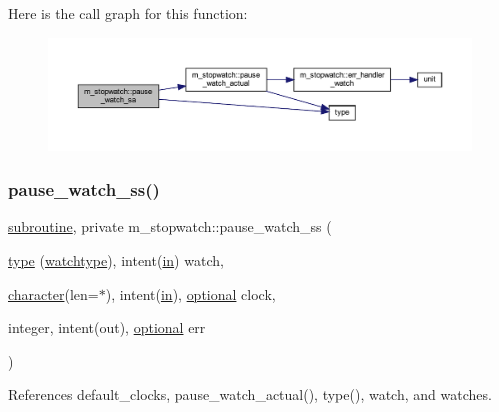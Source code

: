Here is the call graph for this function\+:
\nopagebreak
\begin{figure}[H]
\begin{center}
\leavevmode
\includegraphics[width=350pt]{namespacem__stopwatch_a5101b247e586498a826e1a7819bf13d5_cgraph}
\end{center}
\end{figure}
\mbox{\label{namespacem__stopwatch_afb410e70a5b4002d5028e0a284393959}} 
\subsubsection{\texorpdfstring{pause\+\_\+watch\+\_\+ss()}{pause\_watch\_ss()}}
{\footnotesize\ttfamily \hyperlink{M__stopwatch_83_8txt_acfbcff50169d691ff02d4a123ed70482}{subroutine}, private m\+\_\+stopwatch\+::pause\+\_\+watch\+\_\+ss (\begin{DoxyParamCaption}\item[{\hyperlink{stop__watch_83_8txt_a70f0ead91c32e25323c03265aa302c1c}{type} (\hyperlink{structm__stopwatch_1_1watchtype}{watchtype}), intent(\hyperlink{M__journal_83_8txt_afce72651d1eed785a2132bee863b2f38}{in})}]{watch,  }\item[{\hyperlink{option__stopwatch_83_8txt_abd4b21fbbd175834027b5224bfe97e66}{character}(len=$\ast$), intent(\hyperlink{M__journal_83_8txt_afce72651d1eed785a2132bee863b2f38}{in}), \hyperlink{option__stopwatch_83_8txt_aa4ece75e7acf58a4843f70fe18c3ade5}{optional}}]{clock,  }\item[{integer, intent(out), \hyperlink{option__stopwatch_83_8txt_aa4ece75e7acf58a4843f70fe18c3ade5}{optional}}]{err }\end{DoxyParamCaption})\hspace{0.3cm}{\ttfamily [private]}}



References default\+\_\+clocks, pause\+\_\+watch\+\_\+actual(), type(), watch, and watches.

